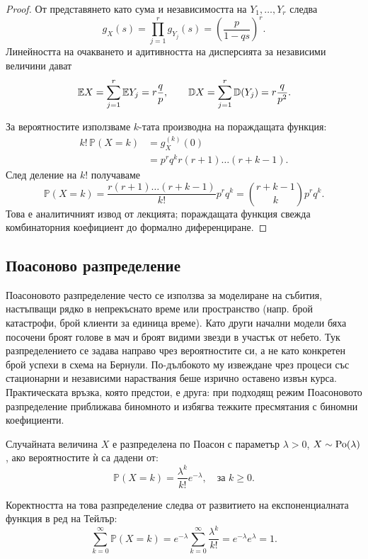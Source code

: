 \begin{proof}
От представянето като сума и независимостта на $Y_1,\dots,Y_r$ следва
\[
g_X(s)=\prod_{j=1}^r g_{Y_j}(s)
      =\left(\frac{p}{1-qs}\right)^r.
\]
Линейността на очакването и адитивността на дисперсията за независими величини дават
\[
\mathbb{E} X=\sum_{j=1}^r\mathbb{E} Y_j=r\frac{q}{p},
\qquad
\mathbb{D} X=\sum_{j=1}^r\mathbb{D}(Y_j)=r\frac{q}{p^2}.
\]

За вероятностите използваме $k$-тата производна на пораждащата функция:
\begin{align*}
k!\,\mathbb{P}(X=k)
  &=g_X^{(k)}(0) \\
  &=p^r q^k r(r+1)\dots(r+k-1).
\end{align*}
След деление на $k!$ получаваме
\[
\mathbb{P}(X=k)
  =\frac{r(r+1)\dots(r+k-1)}{k!}p^rq^k
  =\binom{r+k-1}{k}p^rq^k.
\]
Това е аналитичният извод от лекцията; пораждащата функция свежда комбинаторния коефициент до формално диференциране.
\end{proof}

\subsection{Поасоново разпределение}

Поасоновото разпределение често се използва за моделиране на събития, настъпващи рядко в непрекъснато време или пространство (напр. брой катастрофи, брой клиенти за единица време).
Като други начални модели бяха посочени броят голове в мач и броят видими звезди в участък от небето. Тук разпределението се задава направо чрез вероятностите си, а не като конкретен брой успехи в схема на Бернули. По-дълбокото му извеждане чрез процеси със стационарни и независими нараствания беше изрично оставено извън курса. Практическата връзка, която предстои, е друга: при подходящ режим Поасоновото разпределение приближава биномното и избягва тежките пресмятания с биномни коефициенти.

\begin{defn}
Случайната величина $X$ е разпределена по Поасон с параметър $\lambda > 0$, $X \sim \operatorname{Po}(\lambda)$, ако вероятностите ѝ са дадени от:
\[ \mathbb{P}(X=k) = \frac{\lambda^k}{k!} e^{-\lambda}, \quad \text{за } k \ge 0. \]
\end{defn}

Коректността на това разпределение следва от развитието на експоненциалната функция в ред на Тейлър:
\[ \sum_{k=0}^{\infty} \mathbb{P}(X=k) = e^{-\lambda} \sum_{k=0}^{\infty} \frac{\lambda^k}{k!} = e^{-\lambda} e^{\lambda} = 1. \]

